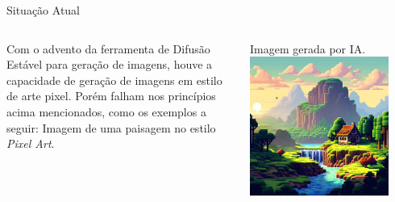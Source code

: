 \documentclass[compress,12pt]{beamer}
\begin{document}
\begin{frame}{Situação Atual}
	\begin{columns}
		\begin{column}{0.5\textwidth}
                Com o advento da ferramenta de Difusão Estável para geração de imagens, houve a capacidade de geração de imagens em estilo de arte pixel. Porém falham nos princípios acima mencionados, como os exemplos a seguir:
                \vfill
                Imagem de uma paisagem no estilo \textit{Pixel Art}.
			        
		\end{column}
		\begin{column}{0.5\textwidth}  %
			\begin{center}
                {Imagem gerada por IA.}    
				\includegraphics[width=0.85\textwidth]{Images/aiGeneratedPixelArt-1.jpeg}
			\end{center}
		\end{column}
	\end{columns}
\end{frame}
\end{document}
